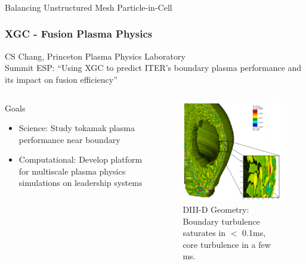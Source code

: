 \documentclass[aspectratio=169]{beamer}
\begin{document}
\begin{frame}
  \frametitle{}
  \center \huge{Balancing Unstructured Mesh Particle-in-Cell}
\end{frame}

\begin{frame}
  \frametitle{XGC - Fusion Plasma Physics}
  CS Chang, Princeton Plasma Physics Laboratory \\
  Summit ESP: ``Using XGC to predict ITER’s boundary plasma performance and its impact on fusion efficiency''
  \begin{columns}
    \begin{column}{0.5\textwidth}
      Goals
      \begin{itemize}
        \item Science: Study tokamak plasma performance near boundary
	\item Computational: Develop platform for multiscale plasma physics simulations on leadership systems
      \end{itemize}
    \end{column}
    \begin{column}{0.5\textwidth}
      \begin{figure}
        \centering
        \includegraphics[width=.7\textwidth]{figures/xgcCase.png} \\
        \tiny{DIII-D Geometry: Boundary turbulence saturates
        in $<$ 0.1ms, core turbulence in a few ms.}
      \end{figure}
    \end{column}
  \end{columns}
\end{frame}
\end{document}
